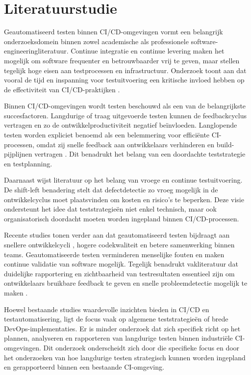 
\section{Literatuurstudie}
\label{sec:literatuurstudie}
Geautomatiseerd testen binnen CI/CD-omgevingen vormt een belangrijk onderzoeksdomein binnen zowel academische als professionele software-engineeringliteratuur. Continue integratie en continue levering maken het mogelijk om software frequenter en betrouwbaarder vrij te geven, maar stellen tegelijk hoge eisen aan testprocessen en infrastructuur. Onderzoek toont aan dat vooral de tijd en inspanning voor testuitvoering een kritische invloed hebben op de effectiviteit van CI/CD-praktijken \autocite{Shahin2017CICD}.

Binnen CI/CD-omgevingen wordt testen beschouwd als een van de belangrijkste succesfactoren. Langdurige of traag uitgevoerde testen kunnen de feedbackcyclus vertragen en zo de ontwikkelproductiviteit negatief beïnvloeden. Langlopende testen worden expliciet benoemd als een belemmering voor efficiënte CI-processen, omdat zij snelle feedback aan ontwikkelaars verhinderen en build-pijplijnen vertragen \autocite{Shahin2017CICD}. Dit benadrukt het belang van een doordachte teststrategie en testplanning.

Daarnaast wijst literatuur op het belang van vroege en continue testuitvoering. De shift-left benadering \autocite{KulkarniShiftLeft} stelt dat defectdetectie zo vroeg mogelijk in de ontwikkelcyclus moet plaatsvinden om kosten en risico’s te beperken. Deze visie ondersteunt het idee dat teststrategieën niet enkel technisch, maar ook organisatorisch doordacht moeten worden ingepland binnen CI/CD-processen.

Recente studies tonen verder aan dat geautomatiseerd testen bijdraagt aan snellere ontwikkelcycli \autocite{YangCICDEfficiency}, hogere codekwaliteit en betere samenwerking binnen teams. Geautomatiseerde testen verminderen menselijke fouten en maken continue validatie \autocite{EstherAutomatedTesting} van software mogelijk. Tegelijk benadrukt vakliteratuur dat duidelijke rapportering en zichtbaarheid van testresultaten essentieel zijn om ontwikkelaars bruikbare feedback te geven en snelle probleemdetectie mogelijk te maken \autocite{Shahin2017CICD}.

Hoewel bestaande studies waardevolle inzichten bieden in CI/CD en testautomatisering, ligt de focus vaak op algemene teststrategieën of brede DevOps-implementaties. Er is minder onderzoek dat zich specifiek richt op het plannen, analyseren en rapporteren van langdurige testen binnen industriële CI-omgevingen. Dit onderzoek onderscheidt zich door die specifieke focus en door het onderzoeken van hoe langdurige testen strategisch kunnen worden ingepland en gerapporteerd binnen een bestaande CI-omgeving.

